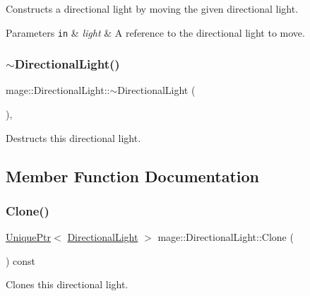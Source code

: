 Constructs a directional light by moving the given directional light.


\begin{DoxyParams}[1]{Parameters}
\mbox{\tt in}  & {\em light} & A reference to the directional light to move. \\
\hline
\end{DoxyParams}
\hypertarget{classmage_1_1_directional_light_a967d33c11a1477c01ce4c9720337caeb}{}\label{classmage_1_1_directional_light_a967d33c11a1477c01ce4c9720337caeb} 
\subsubsection{\texorpdfstring{$\sim$\+Directional\+Light()}{~DirectionalLight()}}
{\footnotesize\ttfamily mage\+::\+Directional\+Light\+::$\sim$\+Directional\+Light (\begin{DoxyParamCaption}{ }\end{DoxyParamCaption})\hspace{0.3cm}{\ttfamily [virtual]}, {\ttfamily [default]}}

Destructs this directional light. 

\subsection{Member Function Documentation}
\hypertarget{classmage_1_1_directional_light_a779c49e066215cff9f80ed40048dfc62}{}\label{classmage_1_1_directional_light_a779c49e066215cff9f80ed40048dfc62} 
\subsubsection{\texorpdfstring{Clone()}{Clone()}}
{\footnotesize\ttfamily \hyperlink{namespacemage_a8c307fbcc33bce9b7f2aa4c26c3b95cf}{Unique\+Ptr}$<$ \hyperlink{classmage_1_1_directional_light}{Directional\+Light} $>$ mage\+::\+Directional\+Light\+::\+Clone (\begin{DoxyParamCaption}{ }\end{DoxyParamCaption}) const}

Clones this directional light.

